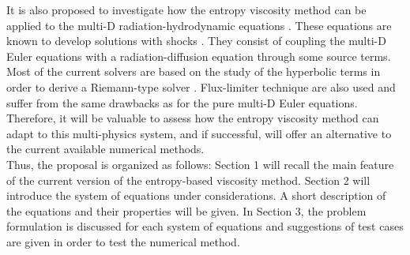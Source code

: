 It is also proposed to investigate how the entropy viscosity method can be applied to the multi-D radiation-hydrodynamic equations \cite{LowrieMorelHittinger}. These equations are known to develop solutions with shocks \cite{Balsara}. They consist of coupling the multi-D Euler equations with a radiation-diffusion equation through some source terms.  Most of the current solvers are based on the study of the hyperbolic terms in order to derive a Riemann-type solver \cite{LowrieMorel}. Flux-limiter technique \cite{EdwardsMorelLowrie} are also used and suffer from the same drawbacks as for the pure multi-D Euler equations. Therefore, it will be valuable to assess how the entropy viscosity method can adapt to this multi-physics system, and if successful, will offer an alternative to the current available numerical methods.\\
Thus, the proposal is organized as follows: Section 1 will recall the main feature of the current version of the entropy-based viscosity method. Section 2 will introduce the system of equations under considerations. A short description of the equations and their properties will be given. In Section 3, the problem formulation is discussed for each system of equations and suggestions of test cases are given in order to test the numerical method.